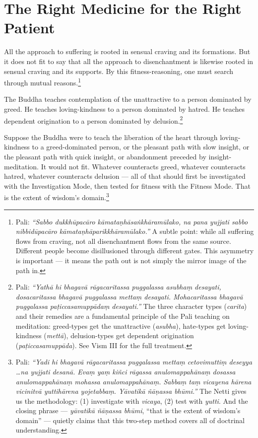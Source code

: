 \section*{The Right Medicine for the Right Patient}

All the approach to suffering is rooted in sensual craving and its formations. But it does not fit to say that all the approach to disenchantment is likewise rooted in sensual craving and its supports. By this fitness-reasoning, one must search through mutual reasons.\footnote{Pali: \textit{``Sabbo dukkhūpacāro kāmataṇhāsaṅkhāramūlako, na pana yujjati sabbo nibbidūpacāro kāmataṇhāparikkhāramūlako.''} A subtle point: while all suffering flows from craving, not all disenchantment flows from the same source. Different people become disillusioned through different gates. This asymmetry is important --- it means the path out is not simply the mirror image of the path in.}

The Buddha teaches contemplation of the unattractive to a person dominated by greed. He teaches loving-kindness to a person dominated by hatred. He teaches dependent origination to a person dominated by delusion.\footnote{Pali: \textit{``Yathā hi bhagavā rāgacaritassa puggalassa asubhaṃ desayati, dosacaritassa bhagavā puggalassa mettaṃ desayati. Mohacaritassa bhagavā puggalassa paṭiccasamuppādaṃ desayati.''} The three character types (\textit{carita}) and their remedies are a fundamental principle of the Pali teaching on meditation: greed-types get the unattractive (\textit{asubha}), hate-types get loving-kindness (\textit{mettā}), delusion-types get dependent origination (\textit{paṭiccasamuppāda}). See Vism III for the full treatment.}

Suppose the Buddha were to teach the liberation of the heart through loving-kindness to a greed-dominated person, or the pleasant path with slow insight, or the pleasant path with quick insight, or abandonment preceded by insight-meditation. It would not fit. Whatever counteracts greed, whatever counteracts hatred, whatever counteracts delusion --- all of that should first be investigated with the Investigation Mode, then tested for fitness with the Fitness Mode. That is the extent of wisdom's domain.\footnote{Pali: \textit{``Yadi hi bhagavā rāgacaritassa puggalassa mettaṃ cetovimuttiṃ deseyya \ldots na yujjati desanā. Evaṃ yaṃ kiñci rāgassa anulomappahānaṃ dosassa anulomappahānaṃ mohassa anulomappahānaṃ. Sabbaṃ taṃ vicayena hārena vicinitvā yuttihārena yojetabbaṃ. Yāvatikā ñāṇassa bhūmi.''} The Netti gives us the methodology: (1) investigate with \textit{vicaya}, (2) test with \textit{yutti}. And the closing phrase --- \textit{yāvatikā ñāṇassa bhūmi}, ``that is the extent of wisdom's domain'' --- quietly claims that this two-step method covers all of doctrinal understanding.}

